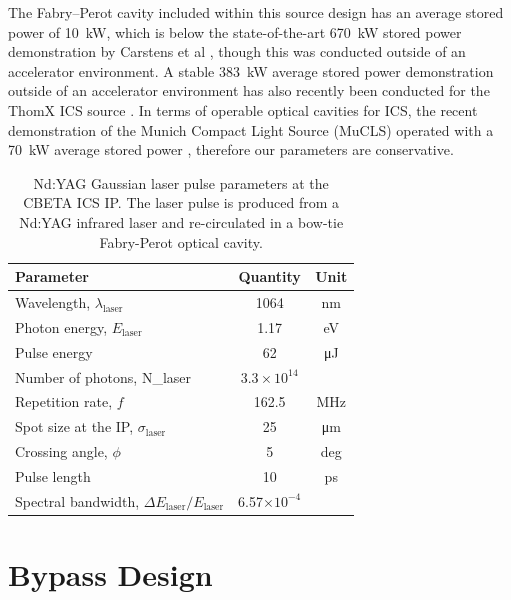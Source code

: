 \documentclass[../main.tex]{subfiles}
\begin{document}
The Fabry--Perot cavity included within this source design has an average stored power of 10~\si{\kilo\watt}, which is below the state-of-the-art 670~\si{\kilo\watt} stored power demonstration by Carstens et al \cite{carstens2014megawatt}, though this was conducted outside of an accelerator environment. A stable 383~\si{\kilo\watt} average stored power demonstration outside of an accelerator environment has also recently been conducted for the ThomX ICS source \cite{liu2018optical}. In terms of operable optical cavities for ICS, the recent demonstration of the Munich Compact Light Source (MuCLS) operated with a 70~\si{\kilo\watt} average stored power \cite{eggl2016munich}, therefore our parameters are conservative.   
\begin{table}[!h]
\centering
\caption{Nd:YAG Gaussian laser pulse parameters at the CBETA ICS IP. The laser pulse is produced from a Nd:YAG infrared laser and re-circulated in a bow-tie Fabry-Perot optical cavity.}
\begin{tabular}{lcc}
\hline\hline
Parameter & Quantity & Unit \\
\hline
Wavelength, $\lambda_\textrm{laser}$ & 1064 & \si{\nano\meter}\\
Photon energy, $E_\textrm{laser}$ & 1.17 & \si{\electronvolt}\\
Pulse energy  & 62 & \si{\micro\joule}\\
Number of photons, N_{\textrm{laser}} & $3.3\times 10^{14}$\\ 
Repetition rate, $f$ & 162.5 & \si{\mega\hertz}\\
Spot size at the IP, $\sigma_\textrm{laser}$ & 25 & \si{\micro\meter}\\
Crossing angle, $\phi$ & 5 & deg \\
Pulse length  & 10 & \si{\pico\second}\\
Spectral bandwidth, $\Delta E_\textrm{laser}/E_\textrm{laser}$ & 6.57$\times 10^{-4}$ &   \\
\hline\hline
\end{tabular}
\label{tab:CBETA_laser_pulse_design_parameters}
\end{table}

\section{Bypass Design}
\label{sec:bypass_design}
\end{document}
